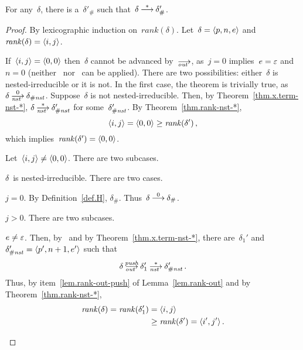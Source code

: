 
\begin{theorem}[Termination]\label{thm.term}\strut\\
  For any~$\delta$, there is a~$\delta'_\#$ such
  that~$\delta\trans[*]\delta'_\#$.
\end{theorem}
\begin{proof}
  By lexicographic induction on~$rank(\delta)$.  Let~$\delta=\<p,n,e>$ and
  $\rank(\delta)=\<i,j>$.
  \begin{basis}
    If~$\<i,j>=\<0,0>$ then~$\delta$ cannot be advanced by~$\out$, as~$j=0$
    implies~$e=\varepsilon$ and~$n=0$ (neither~ nor~ can be
    applied).  There are two possibilities:  either~$\delta$ is
    nested-irreducible or it is not.  In the first case, the theorem is
    trivially true, as~$\delta\nst[0]\delta_\Hnst$.  Suppose~$\delta$ is not
    nested-irreducible.  Then, by Theorem~\ref{thm.x.term-nst-*},
    $\delta\nst[*]\delta'_\Hnst$ for some~$\delta'_{\#\mathit{nst}}$.  By
    Theorem~\ref{thm.rank-nst-*},
    \[
      \<i,j>=\<0,0>\ge\rank(\delta')\,,
    \]
    which implies~$\rank(\delta')=\<0,0>$.
  \end{basis}
  \begin{induction}
    Let~$\<i,j>\ne\<0,0>$.
    There are two subcases.
    \begin{case}
      \label{thm.term.Hnst}
      $\delta$~is nested-irreducible.
      There are two cases.
      \begin{subcase}
        \label{thm.term.Hnst-j0}
        $j=0$.  By Definition~\ref{def.H}, $\delta_\#$.
        Thus~$\delta\trans[0]\delta_\#$.
      \end{subcase}
      \begin{subcase}
        \label{thm.term.Hnst-j>0}
        $j>0$.
        There are two subcases.
        \begin{subsubcase}
          \label{thm.term.Hnst-j>0-nonnil}
          $e\ne\varepsilon$.
          Then, by~ and by Theorem~\ref{thm.x.term-nst-*}, there
          are~$\delta_1'$ and~$\delta'_\Hnst=\<p',n+1,e'>$ such that
          \[
            \delta\outpush\delta_1'\nst[*]\delta'_\Hnst\,.
          \]
          Thus, by item~\eqref{lem.rank-out-push} of
          Lemma~\ref{lem.rank-out} and by Theorem~\ref{thm.rank-nst-*},
          \begin{align*}
            \rank(\delta)=\rank(\delta_1')&=\<i,j>\\
                                          &\ge\rank(\delta')=\<i',j'>\,.
          \end{align*}

\end{subsubcase}
\end{subcase}
\end{case}
\end{induction}
\end{proof}
